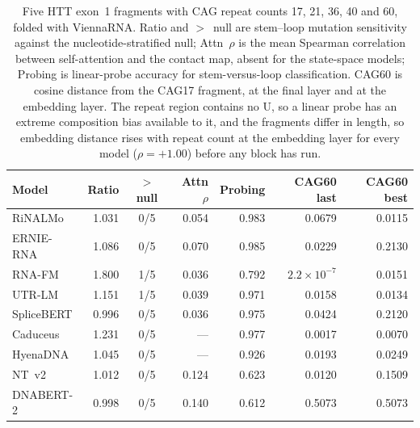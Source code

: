 \begin{table}[htbp]
\centering
\caption{Five HTT exon~1 fragments with CAG repeat counts 17, 21, 36, 40 and 60, folded with ViennaRNA. Ratio and $>$~null are stem--loop mutation sensitivity against the nucleotide-stratified null; Attn~$\rho$ is the mean Spearman correlation between self-attention and the contact map, absent for the state-space models; Probing is linear-probe accuracy for stem-versus-loop classification. CAG60 is cosine distance from the CAG17 fragment, at the final layer and at the embedding layer. The repeat region contains no U, so a linear probe has an extreme composition bias available to it, and the fragments differ in length, so embedding distance rises with repeat count at the embedding layer for every model ($\rho = +1.00$) before any block has run.}
\label{tab:htt}
\small
\begin{tabular}{@{}lrcrrrr@{}}
\toprule
\textbf{Model} & \textbf{Ratio} & \textbf{$>$ null} & \textbf{Attn $\rho$} & \textbf{Probing} & \textbf{CAG60 last} & \textbf{CAG60 best} \\
\midrule
RiNALMo & 1.031 & 0/5 & 0.054 & 0.983 & 0.0679 & 0.0115 \\
ERNIE-RNA & 1.086 & 0/5 & 0.070 & 0.985 & 0.0229 & 0.2130 \\
RNA-FM & 1.800 & 1/5 & 0.036 & 0.792 & $2.2 \times 10^{-7}$ & 0.0151 \\
UTR-LM & 1.151 & 1/5 & 0.039 & 0.971 & 0.0158 & 0.0134 \\
SpliceBERT & 0.996 & 0/5 & 0.036 & 0.975 & 0.0424 & 0.2120 \\
Caduceus & 1.231 & 0/5 & --- & 0.977 & 0.0017 & 0.0070 \\
HyenaDNA & 1.045 & 0/5 & --- & 0.926 & 0.0193 & 0.0249 \\
NT~v2 & 1.012 & 0/5 & 0.124 & 0.623 & 0.0120 & 0.1509 \\
DNABERT-2 & 0.998 & 0/5 & 0.140 & 0.612 & 0.5073 & 0.5073 \\
\bottomrule
\end{tabular}
\end{table}
